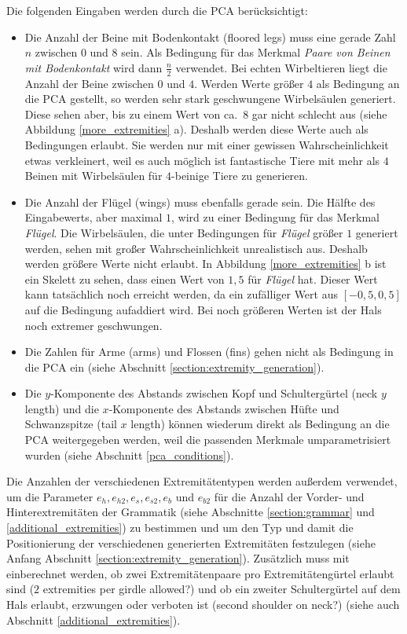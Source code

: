 Die folgenden Eingaben werden durch die PCA berücksichtigt:
\begin{itemize}
 \item Die Anzahl der Beine mit Bodenkontakt (floored legs) muss eine gerade Zahl $n$ zwischen $0$ und $8$ sein. Als Bedingung für das Merkmal \emph{Paare von Beinen mit Bodenkontakt} wird dann $\frac{n}{2}$ verwendet. Bei echten Wirbeltieren liegt die Anzahl der Beine zwischen $0$ und $4$. Werden Werte größer $4$ als Bedingung an die PCA gestellt, so werden sehr stark geschwungene Wirbelsäulen generiert. Diese sehen aber, bis zu einem Wert von ca.\ $8$ gar nicht schlecht aus (siehe Abbildung \ref{more_extremities} a). Deshalb werden diese Werte auch als Bedingungen erlaubt. Sie werden nur mit einer gewissen Wahrscheinlichkeit etwas verkleinert, weil es auch möglich ist fantastische Tiere mit mehr als $4$ Beinen mit Wirbelsäulen für $4$-beinige Tiere zu generieren.
 
 \item Die Anzahl der Flügel (wings) muss ebenfalls gerade sein. Die Hälfte des Eingabewerts, aber maximal $1$, wird zu einer Bedingung für das Merkmal \emph{Flügel}.
 Die Wirbelsäulen, die unter Bedingungen für \emph{Flügel} größer $1$ generiert werden, sehen mit großer Wahrscheinlichkeit unrealistisch aus. Deshalb werden größere Werte nicht erlaubt. In Abbildung \ref{more_extremities} b ist ein Skelett zu sehen, dass einen Wert von $1{,}5$ für \emph{Flügel} hat. Dieser Wert kann tatsächlich noch erreicht werden, da ein zufälliger Wert aus $[-0{,}5, 0{,}5]$ auf die Bedingung aufaddiert wird. Bei noch größeren Werten ist der Hals noch extremer geschwungen.
 
 \item Die Zahlen für Arme (arms) und Flossen (fins) gehen nicht als Bedingung in die PCA ein (siehe Abschnitt \ref{section:extremity_generation}).
 
 \item Die $y$-Komponente des Abstands zwischen Kopf und Schultergürtel (neck $y$ length) und die $x$-Komponente des Abstands zwischen Hüfte und Schwanzspitze (tail $x$ length) können wiederum direkt als Bedingung an die PCA weitergegeben werden, weil die passenden Merkmale umparametrisiert wurden (siehe Abschnitt \ref{pca_conditions}).
\end{itemize}

Die Anzahlen der verschiedenen Extremitätentypen werden außerdem verwendet, um die Parameter $e_h, e_{h2}, e_s, e_{s2}, e_b$ und $e_{b2}$ für die Anzahl der Vorder- und Hinterextremitäten der Grammatik (siehe Abschnitte \ref{section:grammar} und \ref{additional_extremities}) zu bestimmen und um den Typ und damit die Positionierung der verschiedenen generierten Extremitäten festzulegen (siehe Anfang Abschnitt \ref{section:extremity_generation}). Zusätzlich muss mit einberechnet werden, ob zwei Extremitätenpaare pro Extremitätengürtel erlaubt sind ($2$ extremities per girdle allowed?) und ob ein zweiter Schultergürtel auf dem Hals erlaubt, erzwungen oder verboten ist (second shoulder on neck?) (siehe auch Abschnitt \ref{additional_extremities}).

